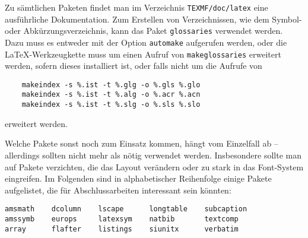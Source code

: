 Zu sämtlichen Paketen findet man im Verzeichnis \verb|TEXMF/doc/latex| eine ausführliche Dokumentation.
Zum Erstellen von Verzeichnissen, wie dem Symbol- oder Abkürzungsverzeichnis, kann das Paket \texttt{glossaries} verwendet werden.
Dazu muss es entweder mit der Option \texttt{automake} aufgerufen werden, oder die \LaTeX-Werkzeugkette muss um einen Aufruf von \texttt{makeglossaries} erweitert werden, sofern dieses installiert ist, oder falls nicht um die Aufrufe von
\begin{verbatim}
	makeindex -s %.ist -t %.glg -o %.gls %.glo
	makeindex -s %.ist -t %.alg -o %.acr %.acn
	makeindex -s %.ist -t %.slg -o %.sls %.slo
\end{verbatim}
erweitert werden.

Welche Pakete sonst noch zum Einsatz kommen, hängt vom Einzelfall ab -- allerdings sollten nicht mehr als nötig verwendet werden.
Insbesondere sollte man auf Pakete verzichten, die das Layout verändern oder zu stark in das Font-System eingreifen.
Im Folgenden sind in alphabetischer Reihenfolge einige Pakete aufgelistet, die für Abschlussarbeiten interessant sein könnten:
\begin{list}{}{\setlength{\leftmargin}{2em}\item[]}
  \verb|amsmath    dcolumn    lscape      longtable    subcaption|\\
  \verb|amssymb    europs     latexsym    natbib       textcomp |\\
  \verb|array      flafter    listings    siunitx      verbatim |
\end{list}